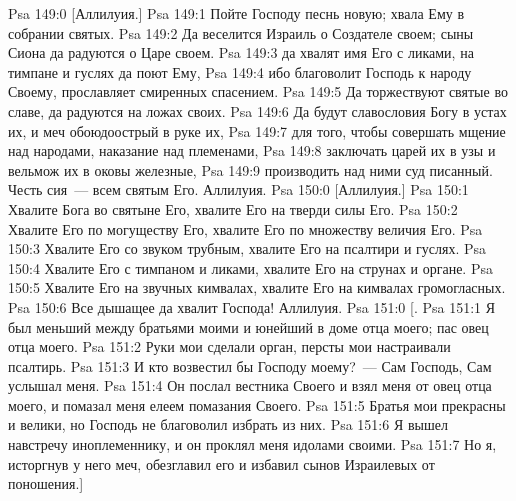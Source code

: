 \vs Psa 149:0 [Аллилуия.]
\rsbpar\vs Psa 149:1 Пойте Господу песнь новую; хвала Ему в собрании святых.
\vs Psa 149:2 Да веселится Израиль о Создателе своем; сыны Сиона да радуются о Царе своем.
\vs Psa 149:3 да хвалят имя Его с ликами, на тимпане и гуслях да поют Ему,
\vs Psa 149:4 ибо благоволит Господь к народу Своему, прославляет смиренных спасением.
\vs Psa 149:5 Да торжествуют святые во славе, да радуются на ложах своих.
\vs Psa 149:6 Да будут славословия Богу в устах их, и меч обоюдоострый в руке их,
\vs Psa 149:7 для того, чтобы совершать мщение над народами, наказание над племенами,
\vs Psa 149:8 заключать царей их в узы и вельмож их в оковы железные,
\vs Psa 149:9 производить над ними суд писанный. Честь сия~--- всем святым Его. Аллилуия.
\vs Psa 150:0 [Аллилуия.]
\rsbpar\vs Psa 150:1 Хвалите Бога во святыне Его, хвалите Его на тверди силы Его.
\vs Psa 150:2 Хвалите Его по могуществу Его, хвалите Его по множеству величия Его.
\vs Psa 150:3 Хвалите Его со звуком трубным, хвалите Его на псалтири и гуслях.
\vs Psa 150:4 Хвалите Его с тимпаном и ликами, хвалите Его на струнах и органе.
\vs Psa 150:5 Хвалите Его на звучных кимвалах, хвалите Его на кимвалах громогласных.
\vs Psa 150:6 Все дышащее да хвалит Господа! Аллилуия.
\vs Psa 151:0 [.
\rsbpar\vs Psa 151:1 Я был меньший между братьями моими и юнейший в доме отца моего; пас овец отца моего.
\vs Psa 151:2 Руки мои сделали орган, персты мои настраивали псалтирь.
\vs Psa 151:3 И кто возвестил бы Господу моему?~--- Сам Господь, Сам услышал меня.
\vs Psa 151:4 Он послал вестника Своего и взял меня от овец отца моего, и помазал меня елеем помазания Своего.
\vs Psa 151:5 Братья мои прекрасны и велики, но Господь не благоволил избрать из них.
\vs Psa 151:6 Я вышел навстречу иноплеменнику, и он проклял меня идолами своими.
\vs Psa 151:7 Но я, исторгнув у него меч, обезглавил его и избавил сынов Израилевых от поношения.]
